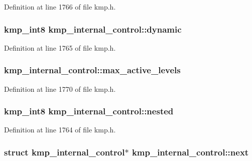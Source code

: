 Definition at line 1766 of file kmp.\-h.

\hypertarget{structkmp__internal__control_a0c375adc5d6b8f4b65fa6fe183bdcfc7}{
\subsubsection[{dynamic}]{\setlength{\rightskip}{0pt plus 5cm}kmp\-\_\-int8 kmp\-\_\-internal\-\_\-control\-::dynamic}}\label{structkmp__internal__control_a0c375adc5d6b8f4b65fa6fe183bdcfc7}


Definition at line 1765 of file kmp.\-h.

\hypertarget{structkmp__internal__control_adb864475ccf4b80f3d928c0fd41e7a04}{
\subsubsection[{max\-\_\-active\-\_\-levels}]{ kmp\-\_\-internal\-\_\-control\-::max\-\_\-active\-\_\-levels}}\label{structkmp__internal__control_adb864475ccf4b80f3d928c0fd41e7a04}


Definition at line 1770 of file kmp.\-h.

\hypertarget{structkmp__internal__control_aa82c78dc9af4ec7faa03cbbbda0c845b}{
\subsubsection[{nested}]{\setlength{\rightskip}{0pt plus 5cm}kmp\-\_\-int8 kmp\-\_\-internal\-\_\-control\-::nested}}\label{structkmp__internal__control_aa82c78dc9af4ec7faa03cbbbda0c845b}


Definition at line 1764 of file kmp.\-h.

\hypertarget{structkmp__internal__control_a4860e215a4af81a65d3441cdf8b2fd97}{
\subsubsection[{next}]{\setlength{\rightskip}{0pt plus 5cm}struct {\bf kmp\-\_\-internal\-\_\-control}$\ast$ kmp\-\_\-internal\-\_\-control\-::next}}\label{structkmp__internal__control_a4860e215a4af81a65d3441cdf8b2fd97}


